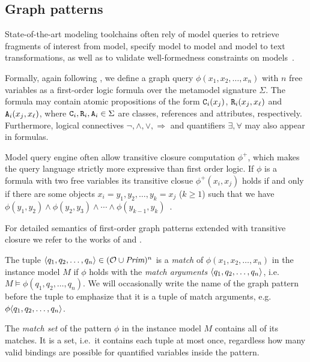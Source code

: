 \subsection{Graph patterns}
\label{ssec:background:patterns}

State-of-the-art modeling toolchains often rely of model queries to retrieve fragments of interest from model, specify model to model and model to text transformations, as well as to validate well-formedness constraints on models~\citep{Bergmann11validation,Ujhelyi15incquery}.

Formally, again following \citet{Varro17generation}, we define a graph query \(\phi(x_1, x_2, \ldots, x_n)\) with \(n\) free variables as a first-order logic formula over the metamodel signature \(\Sigma\). The formula may contain atomic propositions of the form \(\texttt{\upshape C}_i(x_j)\), \(\texttt{\upshape R}_i(x_j, x_\ell)\) and \(\texttt{\upshape A}_i(x_j, x_\ell)\), where \(\texttt{\upshape C}_i, \texttt{\upshape R}_i, \texttt{\upshape A}_i \in \Sigma\) are classes, references and attributes, respectively. Furthermore, logical connectives \(\neg, \land, \lor, \Rightarrow\) and quantifiers \(\exists, \forall\) may also appear in formulas.

Model query engine often allow transitive closure computation \(\phi^+\), which makes the query language strictly more expressive than first order logic. If \(\phi\) is a formula with two free variables its transitive closue \(\phi^+(x_i, x_j)\) holds if and only if there are some objects \(x_i = y_1, y_2, \ldots, y_k = x_j\) (\(k \ge 1\)) such that we have \(\phi(y_1, y_2) \land \phi(y_2, y_3) \land \cdots \land \phi(y_{k - 1}, y_k)\)~\citep{Bergmann12incscc}.

For detailed semantics of first-order graph patterns extended with transitive closure we refer to the works of \citet{Semerath17rewriting} and \citet{Varro17generation}.

The tuple \(\langle q_1, q_2, \ldots, q_n \rangle \in (\mathcal{O} \cup \textit{Prim})^n\) is a \emph{match} of \(\phi(x_1, x_2, \ldots, x_n)\) in the instance model \(M\) if \(\phi\) holds with the \emph{match arguments} \(\langle q_1, q_2, \ldots, q_n \rangle\), i.e.~\(M \vDash \phi(q_1, q_2, \ldots, q_n)\). We will occasionally write the name of the graph pattern before the tuple to emphasize that it is a tuple of match arguments, e.g.~\(\phi\langle q_1, q_2, \ldots, q_n\rangle\).

The \emph{match set} of the pattern \(\phi\) in the instance model \(M\) contains all of its matches. It is a set, i.e.~it contains each tuple at most once, regardless how many valid bindings are possible for quantified variables inside the pattern.

